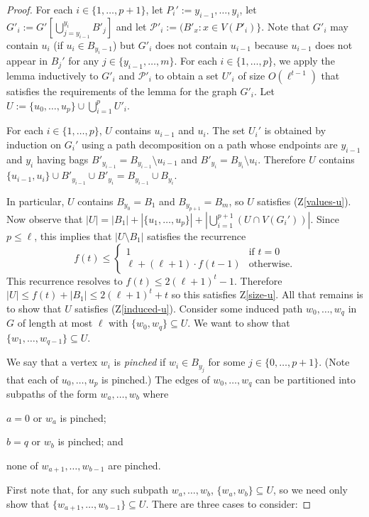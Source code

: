 \documentclass[kpfonts]{patmorin}
\theoremstyle{named}
\begin{document}
\begin{proof}
    For each $i\in\{1,\ldots,p+1\}$, let $P_i':=y_{i-1},\ldots,y_i$, let $G'_i:=G'[\bigcup_{j=y_{i-1}}^{y_i}B'_j]$ and let $\mathcal{P}'_i:=(B'_x:x\in V(P'_i)\}$. Note that $G'_i$ may contain $u_i$ (if $u_i\in B_{y_i-1}$) but $G'_i$ does not contain $u_{i-1}$ because $u_{i-1}$ does not appear in $B_j'$ for any $j\in\{y_{i-1},\ldots,m\}$.  For each $i\in\{1,\ldots,p\}$, we apply the lemma inductively to $G'_i$ and $\mathcal{P}'_i$ to obtain a set $U'_i$ of size $O(\ell^{t-1})$ that satisfies the requirements of the lemma for the graph $G'_i$. Let $U:=\{u_0,\ldots,u_p\}\cup\bigcup_{i=1}^p U'_i$.

    For each $i\in\{1,\ldots,p\}$, $U$ contains $u_{i-1}$ and $u_i$. The set $U_i'$ is obtained by induction on $G_i'$ using a path decomposition on a path whose endpoints are $y_{i-1}$ and $y_i$ having bags $B'_{y_{i-1}}=B_{y_{i-1}}\setminus u_{i-1}$ and $B'_{y_{i}}=B_{y_{i}}\setminus u_{i}$.  Therefore $U$ contains $\{u_{i-1},u_i\}\cup B'_{y_{i-1}}\cup B'_{y_i}=B_{y_{i-1}}\cup B_{y_i}$.

    In particular, $U$ contains $B_{y_0}=B_1$ and $B_{y_{p+1}}=B_m$, so $U$ satisfies (Z\ref{values-u}).
    Now observe that $|U|=|B_1| + |\{u_1,\ldots,u_p\}|+ |\bigcup_{i=1}^{p+1}(U\cap V(G_i'))|$.  Since $p\le \ell$, this implies that $|U\setminus B_1|$ satisfies the recurrence
    \[
       f(t) \le \begin{cases}
                  1 & \text{if $t=0$} \\
                  \ell + (\ell+1)\cdot f(t-1) & \text{otherwise.}
                \end{cases}
    \]
    This recurrence resolves to $f(t)\le 2(\ell+1)^t - 1$.  Therefore $|U|\le f(t)+|B_{1}| \le 2(\ell+1)^t + t$ so this satisfies Z\ref{size-u}.  All that remains is to show that $U$ satisfies (Z\ref{induced-u}).  Consider some induced path $w_0,\ldots,w_q$ in $G$ of length at most $\ell$ with $\{w_0,w_q\}\subseteq U$.  We want to show that $\{w_1,\ldots,w_{q-1}\}\subseteq U$.

    We say that a vertex $w_i$ is \emph{pinched} if $w_i\in B_{y_j}$ for some $j\in\{0,\ldots,p+1\}$. (Note that each of $u_0,\ldots,u_p$ is pinched.) The edges of $w_0,\ldots,w_q$ can be partitioned into subpaths of the form $w_{a},\ldots,w_{b}$ where
    \begin{inparaenum}[(i)]
        \item $a=0$ or $w_a$ is pinched;
        \item $b=q$ or $w_b$ is pinched; and
        \item none of $w_{a+1},\ldots,w_{b-1}$ are pinched.
    \end{inparaenum}
    First note that, for any such subpath $w_a,\ldots,w_b$, $\{w_a,w_b\}\subseteq U$, so we need only show that $\{w_{a+1},\ldots,w_{b-1}\}\subseteq U$.  There are three cases to consider:


\end{proof}
\end{document}
